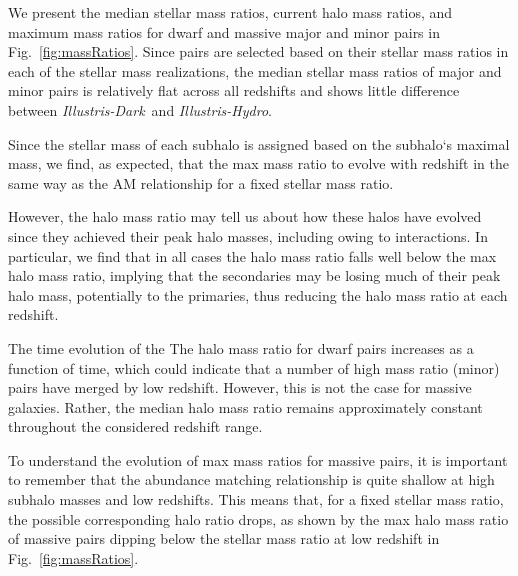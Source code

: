 \documentclass[twocolumn]{aastex63}
\newcommand\ID{\textit{Illustris-Dark}}
\newcommand\IH{\textit{Illustris-Hydro}}
\newcommand{\kc}[1]{\textcolor{mypink}{\textbf{#1}} }
\begin{document}
We present the median stellar mass ratios, current halo mass ratios, and maximum mass ratios for dwarf and massive major and minor pairs in Fig.~\ref{fig:massRatios}. Since pairs are selected based on their stellar mass ratios in each of the stellar mass realizations, the median stellar mass ratios of major and minor pairs is relatively flat across all redshifts and shows little difference between \ID\ and \IH. 

Since the stellar mass of each subhalo is assigned based on the subhalo`s maximal mass, we find, as expected, that the max mass ratio to evolve with redshift in the same way as the %
AM relationship for a fixed stellar mass ratio. 

However, the halo mass ratio may tell us about how these halos have evolved since they achieved their peak halo masses, including owing to interactions. In particular, we find that in all cases the halo mass ratio falls well below the max halo mass ratio, implying that the secondaries may be losing much of their peak halo mass, potentially to the primaries, thus reducing the halo mass ratio at each redshift. 


The time evolution of the
The halo mass ratio for dwarf pairs increases as a function of time, 
which could indicate that a number of high mass ratio (minor) pairs have merged by low redshift.
However, this is not the case for massive galaxies. Rather, the median halo mass ratio remains approximately constant throughout the considered redshift range. 


To understand the evolution of max mass ratios for massive pairs, it is important to remember that the abundance matching relationship is quite shallow at high subhalo masses and low redshifts. This means that, for a fixed stellar mass ratio, the possible corresponding halo ratio drops, as shown by the max halo mass ratio of massive pairs dipping below the stellar mass ratio at low redshift in Fig.~\ref{fig:massRatios}. 




\end{document}

